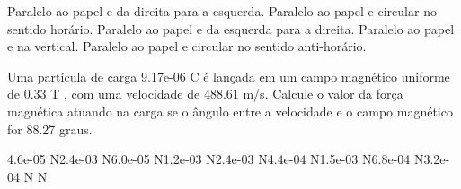 \documentclass[12pt, addpoints]{exam}
\begin{document}
\begin{questions}
\begin{multicols*}{2}
\begin{choices}
\choice Paralelo ao papel e da direita para a esquerda. 
\choice Paralelo ao papel e circular no sentido horário. 
\choice Paralelo ao papel e da esquerda para a direita. 
\choice Paralelo ao papel e na vertical. 
\choice Paralelo ao papel e circular no sentido anti-horário. 
\end{choices}
\question Uma partícula de carga 9.17e-06 C é lançada em um campo magnético uniforme de    0.33 T , com uma velocidade de 488.61 m/s. Calcule o valor da força magnética atuando na carga se o ângulo entre a velocidade e o campo magnético for   88.27 graus.

\begin{oneparchoices}
\choice 4.6e-05 N\choice 2.4e-03 N\choice 6.0e-05 N\choice 1.2e-03 N\choice 2.4e-03 N\choice 4.4e-04 N\choice 1.5e-03 N\choice 6.8e-04 N\choice 3.2e-04 N N
\end{oneparchoices}\end{multicols*}
\end{questions}
\newpage
\end{document}

